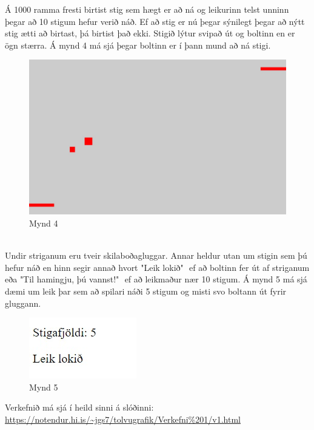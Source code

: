 \documentclass[12pt]{article}
\begin{document}
\begin{small}
Á 1000 ramma fresti birtist stig sem hægt er að ná og leikurinn telst unninn þegar að 10 stigum hefur verið náð. Ef að stig er nú þegar sýnilegt þegar að nýtt stig ætti að birtast, þá birtist það ekki. Stigið lýtur svipað út og boltinn en er ögn stærra. Á mynd 4 má sjá þegar boltinn er í þann mund að ná stigi.\\
\begin{figure}[h!]
	\centering
  	\includegraphics[scale=0.25]{4}
  	\caption{Mynd 4}
\end{figure}\\
Undir striganum eru tveir skilaboðagluggar. Annar heldur utan um stigin sem þú hefur náð en hinn segir annað hvort "Leik lokið" $\text{}$ ef að boltinn fer út af striganum eða "Til hamingju, þú vannst!" $\text{}$ ef að leikmaður nær 10 stigum. Á mynd 5 má sjá dæmi um leik þar sem að spilari náði 5 stigum og misti svo boltann út fyrir gluggann.
\begin{figure}[h!]
	\centering
  	\includegraphics[scale=1]{5}
  	\caption{Mynd 5}
\end{figure}

Verkefnið má sjá í heild sinni á slóðinni:\\
\url{https://notendur.hi.is/~jgs7/tolvugrafik/Verkefni%201/v1.html}
\end{small}
\end{document}
